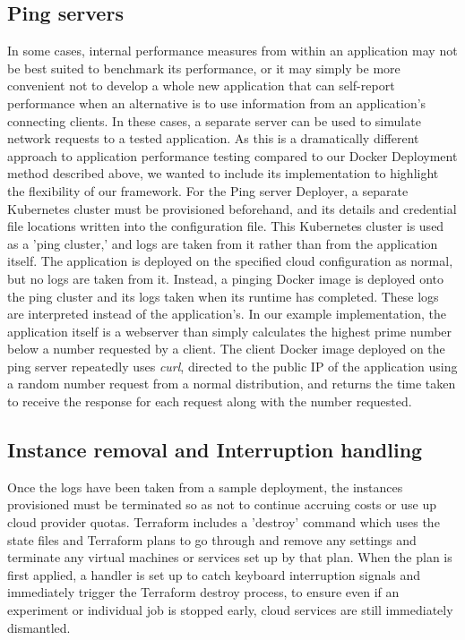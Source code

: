 \documentclass{report}
\begin{document}
\subsection{Ping servers}
In some cases, internal performance measures from within an application may not be best suited to benchmark its performance, or it may simply be more convenient not to develop a whole new application that can self-report performance when an alternative is to use information from an application's connecting clients. 
In these cases, a separate server can be used to simulate network requests to a tested application. As this is a dramatically different approach to application performance testing compared to our Docker Deployment method described above, we wanted to include its implementation to highlight the flexibility of our framework.
For the Ping server Deployer, a separate Kubernetes cluster must be provisioned beforehand, and its details and credential file locations written into the configuration file. This Kubernetes cluster is used as a 'ping cluster,' and logs are taken from it rather than from the application itself. The application is deployed on the specified cloud configuration as normal, but no logs are taken from it. Instead, a pinging Docker image is deployed onto the ping cluster and its logs taken when its runtime has completed. These logs are interpreted instead of the application's. In our example implementation, the application itself is a webserver than simply calculates the highest prime number below a number requested by a client. The client Docker image deployed on the ping server repeatedly uses \textit{curl}, directed to the public IP of the application using a random number request from a normal distribution, and returns the time taken to receive the response for each request along with the number requested.  
\subsection{Instance removal and Interruption handling}
Once the logs have been taken from a sample deployment, the instances provisioned must be terminated so as not to continue accruing costs or use up cloud provider quotas. Terraform includes a 'destroy' command which uses the state files and Terraform plans to go through and remove any settings and terminate any virtual machines or services set up by that plan.
When the plan is first applied, a handler is set up to catch keyboard interruption signals and immediately trigger the Terraform destroy process, to ensure even if an experiment or individual job is stopped early, cloud services are still immediately dismantled. 
\end{document}
